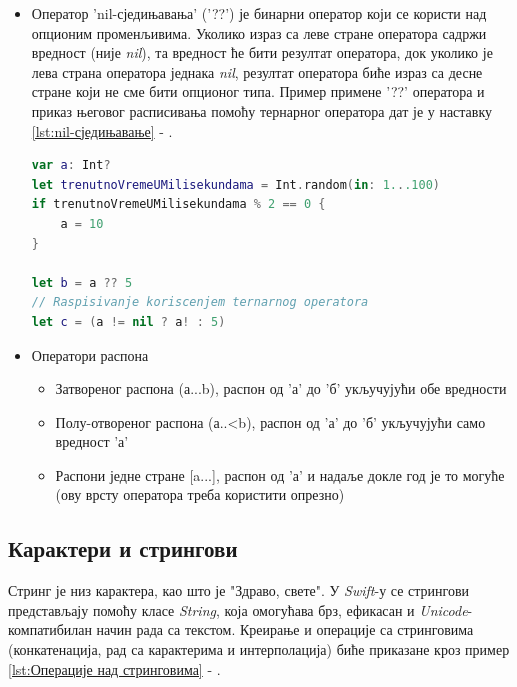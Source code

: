 \documentclass[12pt,oneside]{memoir}
\begin{document}
\begin{itemize}
    \item Оператор 'nil-сједињавања' ('??') је бинарни оператор који се користи над опционим променљивима. Уколико израз са леве стране оператора садржи вредност (није \textit{nil}), та вредност ће бити резултат оператора, док уколико је лева страна оператора једнака  \textit{nil}, резултат оператора биће израз са десне стране који не сме бити опционог типа. Пример примене '??' оператора и приказ његовог расписивања помоћу тернарног оператора дат је у наставку \ref{lst:nil-сједињавање} - .
    
\begin{lstlisting}[caption=\textit{{nil-сједињавање}}, label={lst:nil-сједињавање}, language=Swift, frame=single]
var a: Int?
let trenutnoVremeUMilisekundama = Int.random(in: 1...100)
if trenutnoVremeUMilisekundama % 2 == 0 {
    a = 10
}

let b = a ?? 5
// Raspisivanje koriscenjem ternarnog operatora
let c = (a != nil ? a! : 5)
\end{lstlisting}
    
    \item Оператори распона
    
\begin{itemize}
    \item Затвореног распона (а...b), распон од 'а' до 'б' укључујући обе вредности
    \item Полу-отвореног распона (а..<b), распон од 'а' до 'б' укључујући само вредност 'а'
    \item Распони једне стране [a...], распон од 'а' и надаље докле год је то могуће (ову врсту оператора треба користити опрезно)
\end{itemize}

\end{itemize}

\subsection{Карактери и стрингови}

\indent Стринг је низ карактера, као што је "Здраво, свете". У \textit{Swift}-у се стрингови представљају помоћу класе \textit{String}, која омогућава брз, ефикасан и \textit{Unicode}-компатибилан начин рада са текстом. Креирање и операције са стринговима (конкатенација, рад са карактерима и интерполација) биће приказане кроз пример \ref{lst:Операције над стринговима} - .
\end{document}
